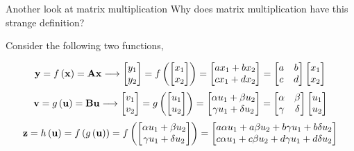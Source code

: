 \documentclass[aspectratio=169]{beamer}
\def\mf{\ensuremath\mathbf}
\def\lp{\ensuremath\left(}
\def\rp{\ensuremath\right)}
\begin{document}
\begin{frame}[t]{Another look at matrix multiplication}
Why does matrix multiplication have this strange definition?

\vspace{0.3cm}
Consider the following two functions,
\begin{scriptsize}
\[ \mf{y} = f\lp\mf{x}\rp = \mf{A}\mf{x} \longrightarrow \begin{bmatrix}y_1 \\ y_2\end{bmatrix} = f\left(\begin{bmatrix}x_1 \\ x_2\end{bmatrix}\right) = \begin{bmatrix}ax_1 + bx_2 \\ cx_1 + dx_2\end{bmatrix} = \begin{bmatrix}a & b \\ c & d\end{bmatrix}\begin{bmatrix}x_1 \\ x_2\end{bmatrix}\]
\[ \mf{v} = g\lp\mf{u}\rp = \mf{B}\mf{u} \longrightarrow \begin{bmatrix}v_1 \\ v_2\end{bmatrix} = g\left(\begin{bmatrix}u_1 \\ u_2\end{bmatrix}\right) = \begin{bmatrix}\alpha u_1 + \beta u_2 \\ \gamma u_1 + \delta u_2\end{bmatrix} = \begin{bmatrix}\alpha & \beta \\ \gamma & \delta\end{bmatrix}\begin{bmatrix}u_1 \\ u_2\end{bmatrix}\]
\[ \begin{split}
\mf{z} = h\left(\mf{u}\right) &= f\left(g\left(\mf{u}\right)\right) = f\left(\begin{bmatrix}\alpha u_1 + \beta u_2 \\ \gamma u_1 + \delta u_2\end{bmatrix}\right) = \begin{bmatrix}a\alpha u_1 + a\beta u_2 + b\gamma u_1 + b\delta u_2 \\ c\alpha u_1 + c\beta u_2 + d\gamma u_1 + d\delta u_2 \end{bmatrix}\\

\end{split}\]
\end{scriptsize}
\end{frame}
\end{document}
